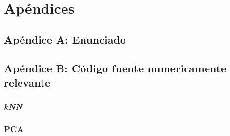 \section{Apéndices}

	\subsection{Apéndice A: Enunciado}
	

	\subsection{Apéndice B: Código fuente numericamente relevante}
	\clearpage

		\subsubsection{\textit{kNN}}



		\subsubsection{PCA}






	
	\clearpage

